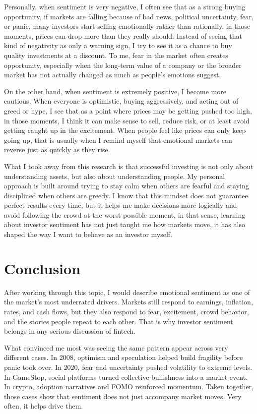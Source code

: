 \documentclass[12pt]{article}
\begin{document}
Personally, when sentiment is very negative, I often see that as a strong buying opportunity, if markets are falling because of bad news, political uncertainty, fear, or panic, many investors start selling emotionally rather than rationally, in those moments, prices can drop more than they really should. Instead of seeing that kind of negativity as only a warning sign, I try to see it as a chance to buy quality investments at a discount. To me, fear in the market often creates opportunity, especially when the long-term value of a company or the broader market has not actually changed as much as people’s emotions suggest.

On the other hand, when sentiment is extremely positive, I become more cautious. When everyone is optimistic, buying aggressively, and acting out of greed or hype, I see that as a point where prices may be getting pushed too high, in those moments, I think it can make sense to sell, reduce risk, or at least avoid getting caught up in the excitement. When people feel like prices can only keep going up, that is usually when I remind myself that emotional markets can reverse just as quickly as they rise.

What I took away from this research is that successful investing is not only about understanding assets, but also about understanding people. My personal approach is built around trying to stay calm when others are fearful and staying disciplined when others are greedy. I know that this mindset does not guarantee perfect results every time, but it helps me make decisions more logically and avoid following the crowd at the worst possible moment, in that sense, learning about investor sentiment has not just taught me how markets move, it has also shaped the way I want to behave as an investor myself.

\section{Conclusion}

After working through this topic, I would describe emotional sentiment as one of the market's most underrated drivers. Markets still respond to earnings, inflation, rates, and cash flows, but they also respond to fear, excitement, crowd behavior, and the stories people repeat to each other. That is why investor sentiment belongs in any serious discussion of fintech.

What convinced me most was seeing the same pattern appear across very different cases. In 2008, optimism and speculation helped build fragility before panic took over. In 2020, fear and uncertainty pushed volatility to extreme levels. In GameStop, social platforms turned collective bullishness into a market event. In crypto, adoption narratives and FOMO reinforced momentum. Taken together, those cases show that sentiment does not just accompany market moves. Very often, it helps drive them.
\end{document}
